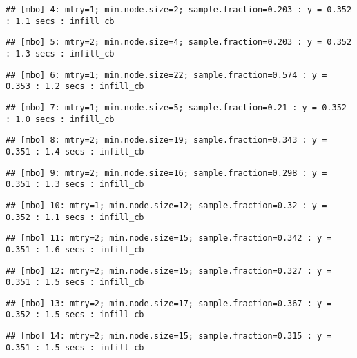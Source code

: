 \documentclass[
]{article}
\begin{document}
\begin{verbatim}
## [mbo] 4: mtry=1; min.node.size=2; sample.fraction=0.203 : y = 0.352 : 1.1 secs : infill_cb
\end{verbatim}

\begin{verbatim}
## [mbo] 5: mtry=2; min.node.size=4; sample.fraction=0.203 : y = 0.352 : 1.3 secs : infill_cb
\end{verbatim}

\begin{verbatim}
## [mbo] 6: mtry=1; min.node.size=22; sample.fraction=0.574 : y = 0.353 : 1.2 secs : infill_cb
\end{verbatim}

\begin{verbatim}
## [mbo] 7: mtry=1; min.node.size=5; sample.fraction=0.21 : y = 0.352 : 1.0 secs : infill_cb
\end{verbatim}

\begin{verbatim}
## [mbo] 8: mtry=2; min.node.size=19; sample.fraction=0.343 : y = 0.351 : 1.4 secs : infill_cb
\end{verbatim}

\begin{verbatim}
## [mbo] 9: mtry=2; min.node.size=16; sample.fraction=0.298 : y = 0.351 : 1.3 secs : infill_cb
\end{verbatim}

\begin{verbatim}
## [mbo] 10: mtry=1; min.node.size=12; sample.fraction=0.32 : y = 0.352 : 1.1 secs : infill_cb
\end{verbatim}

\begin{verbatim}
## [mbo] 11: mtry=2; min.node.size=15; sample.fraction=0.342 : y = 0.351 : 1.6 secs : infill_cb
\end{verbatim}

\begin{verbatim}
## [mbo] 12: mtry=2; min.node.size=15; sample.fraction=0.327 : y = 0.351 : 1.5 secs : infill_cb
\end{verbatim}

\begin{verbatim}
## [mbo] 13: mtry=2; min.node.size=17; sample.fraction=0.367 : y = 0.352 : 1.5 secs : infill_cb
\end{verbatim}

\begin{verbatim}
## [mbo] 14: mtry=2; min.node.size=15; sample.fraction=0.315 : y = 0.351 : 1.5 secs : infill_cb
\end{verbatim}
\end{document}
